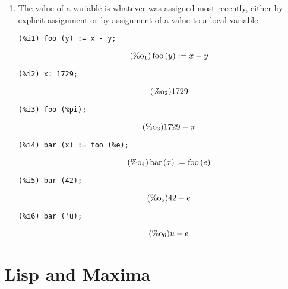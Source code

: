 \documentclass[12pt,leqno]{article}
\begin{document}
\begin{enumerate}
\item The value of a variable is whatever was assigned most recently,
either by explicit assignment or by assignment of a value to a local variable.

\begin{verbatim}
(%i1) foo (y) := x - y;
\end{verbatim}
\begin{equation}
\tag{$\mathop{\mathrm{\%o}}_{1}$}\mathop{\mathrm{foo}}\left(y\right) := x-y
\label{eq:doc-group1-code35-1-1}
\end{equation}
\begin{verbatim}
(%i2) x: 1729;
\end{verbatim}
\begin{equation}
\tag{$\mathop{\mathrm{\%o}}_{2}$}1729
\label{eq:doc-group1-code35-2-1}
\end{equation}
\begin{verbatim}
(%i3) foo (%pi);
\end{verbatim}
\begin{equation}
\tag{$\mathop{\mathrm{\%o}}_{3}$}1729-\pi
\label{eq:doc-group1-code35-3-1}
\end{equation}
\begin{verbatim}
(%i4) bar (x) := foo (%e);
\end{verbatim}
\begin{equation}
\tag{$\mathop{\mathrm{\%o}}_{4}$}\mathop{\mathrm{bar}}\left(x\right) := \mathop{\mathrm{foo}}\left(e\right)
\label{eq:doc-group1-code35-4-1}
\end{equation}
\begin{verbatim}
(%i5) bar (42);
\end{verbatim}
\begin{equation}
\tag{$\mathop{\mathrm{\%o}}_{5}$}42-e
\label{eq:doc-group1-code35-5-1}
\end{equation}
\begin{verbatim}
(%i6) bar ('u);
\end{verbatim}
\begin{equation}
\tag{$\mathop{\mathrm{\%o}}_{6}$}u-e
\label{eq:doc-group1-code35-6-1}
\end{equation}


\end{enumerate}

\section{Lisp and Maxima}
\end{document}
